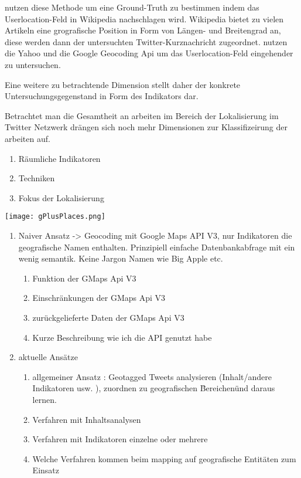 		\cite{Hecht2011} nutzen diese Methode um eine Ground-Truth zu bestimmen indem das Userlocation-Feld in Wikipedia nachschlagen wird. Wikipedia bietet zu vielen Artikeln eine grografische Position in Form von Längen- und Breitengrad an, diese werden dann der untersuchten Twitter-Kurznachricht zugeordnet. 
		\cite{Hale2012} nutzen die Yahoo und die Google Geocoding Api um das Userlocation-Feld eingehender zu untersuchen.  
		

		
		Eine weitere zu betrachtende Dimension stellt daher der konkrete Untersuchungsgegenstand in Form des Indikators dar.


		Betrachtet man die Gesamtheit an arbeiten im Bereich der Lokalisierung im Twitter Netzwerk drängen sich noch mehr Dimensionen zur Klassifizeirung der arbeiten auf.

		

		\begin{enumerate}
		 	\item Räumliche Indikatoren
		 	\item Techniken
		 	\item Fokus der Lokalisierung
		 \end{enumerate} 	









\texttt{[image: gPlusPlaces.png]}

		\begin{enumerate}
			\item Naiver Ansatz -> Geocoding mit Google Maps API V3, nur Indikatoren die geografische Namen enthalten. 
					Prinzipiell einfache Datenbankabfrage mit ein wenig semantik. 
					Keine Jargon Namen wie Big Apple etc.
				\begin{enumerate}
					\item Funktion der GMaps Api V3
					\item Einschränkungen der GMaps Api V3
					\item zurückgelieferte Daten der GMaps Api V3
					\item Kurze Beschreibung wie ich die API genutzt habe
				\end{enumerate}
			\item aktuelle Ansätze
				\begin{enumerate}
					\item{ 
					allgemeiner Ansatz : Geotagged Tweets analysieren (Inhalt/andere Indikatoren usw. ), zuordnen zu geografischen \"Bereichen\" und daraus lernen.}
					\item Verfahren mit Inhaltsanalysen
					\item Verfahren mit Indikatoren einzelne oder mehrere
					\item Welche Verfahren kommen beim mapping auf  geografische Entitäten zum Einsatz
				\end{enumerate}
		\end{enumerate}

